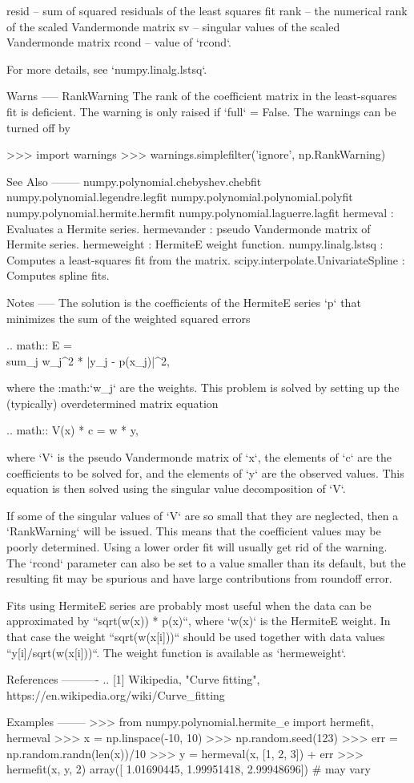 \begin{DoxyVerb}
    resid -- sum of squared residuals of the least squares fit
    rank -- the numerical rank of the scaled Vandermonde matrix
    sv -- singular values of the scaled Vandermonde matrix
    rcond -- value of `rcond`.

    For more details, see `numpy.linalg.lstsq`.

Warns
-----
RankWarning
    The rank of the coefficient matrix in the least-squares fit is
    deficient. The warning is only raised if `full` = False.  The
    warnings can be turned off by

    >>> import warnings
    >>> warnings.simplefilter('ignore', np.RankWarning)

See Also
--------
numpy.polynomial.chebyshev.chebfit
numpy.polynomial.legendre.legfit
numpy.polynomial.polynomial.polyfit
numpy.polynomial.hermite.hermfit
numpy.polynomial.laguerre.lagfit
hermeval : Evaluates a Hermite series.
hermevander : pseudo Vandermonde matrix of Hermite series.
hermeweight : HermiteE weight function.
numpy.linalg.lstsq : Computes a least-squares fit from the matrix.
scipy.interpolate.UnivariateSpline : Computes spline fits.

Notes
-----
The solution is the coefficients of the HermiteE series `p` that
minimizes the sum of the weighted squared errors

.. math:: E = \\sum_j w_j^2 * |y_j - p(x_j)|^2,

where the :math:`w_j` are the weights. This problem is solved by
setting up the (typically) overdetermined matrix equation

.. math:: V(x) * c = w * y,

where `V` is the pseudo Vandermonde matrix of `x`, the elements of `c`
are the coefficients to be solved for, and the elements of `y` are the
observed values.  This equation is then solved using the singular value
decomposition of `V`.

If some of the singular values of `V` are so small that they are
neglected, then a `RankWarning` will be issued. This means that the
coefficient values may be poorly determined. Using a lower order fit
will usually get rid of the warning.  The `rcond` parameter can also be
set to a value smaller than its default, but the resulting fit may be
spurious and have large contributions from roundoff error.

Fits using HermiteE series are probably most useful when the data can
be approximated by ``sqrt(w(x)) * p(x)``, where `w(x)` is the HermiteE
weight. In that case the weight ``sqrt(w(x[i]))`` should be used
together with data values ``y[i]/sqrt(w(x[i]))``. The weight function is
available as `hermeweight`.

References
----------
.. [1] Wikipedia, "Curve fitting",
       https://en.wikipedia.org/wiki/Curve_fitting

Examples
--------
>>> from numpy.polynomial.hermite_e import hermefit, hermeval
>>> x = np.linspace(-10, 10)
>>> np.random.seed(123)
>>> err = np.random.randn(len(x))/10
>>> y = hermeval(x, [1, 2, 3]) + err
>>> hermefit(x, y, 2)
array([ 1.01690445,  1.99951418,  2.99948696]) # may vary\end{DoxyVerb}
